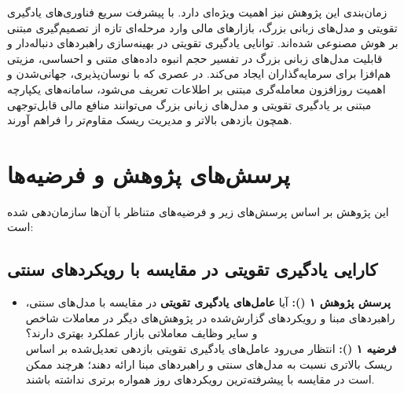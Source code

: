 \documentclass[12pt, a4paper]{report}
\begin{document}
زمان‌بندی این پژوهش نیز اهمیت ویژه‌ای دارد. با پیشرفت سریع فناوری‌های یادگیری تقویتی و مدل‌های زبانی بزرگ، بازارهای مالی وارد مرحله‌ای تازه از تصمیم‌گیری مبتنی بر هوش مصنوعی شده‌اند. توانایی یادگیری تقویتی در بهینه‌سازی راهبردهای دنباله‌دار و قابلیت مدل‌های زبانی بزرگ در تفسیر حجم انبوه داده‌های متنی و احساسی، مزیتی هم‌افزا برای سرمایه‌گذاران ایجاد می‌کند. در عصری که با نوسان‌پذیری، جهانی‌شدن و اهمیت روزافزون معامله‌گری مبتنی بر اطلاعات تعریف می‌شود، سامانه‌های یکپارچه مبتنی بر یادگیری تقویتی و مدل‌های زبانی بزرگ می‌توانند منافع مالی قابل‌توجهی همچون بازدهی بالاتر و مدیریت ریسک مقاوم‌تر را فراهم آورند.

\section{پرسش‌های پژوهش و فرضیه‌ها}

این پژوهش بر اساس پرسش‌های زیر و فرضیه‌های متناظر با آن‌ها سازمان‌دهی شده است:

\subsection*{کارایی یادگیری تقویتی در مقایسه با رویکردهای سنتی }
\begin{itemize}
    \item \textbf{پرسش پژوهش ۱ ():} آیا \textbf{عامل‌های یادگیری تقویتی} در مقایسه با مدل‌های سنتی، راهبردهای مبنا و رویکردهای گزارش‌شده در پژوهش‌های دیگر در معاملات شاخص  و سایر وظایف معاملاتی بازار عملکرد بهتری دارند؟ \\
    \textbf{فرضیه ۱ ():} انتظار می‌رود عامل‌های یادگیری تقویتی بازدهی تعدیل‌شده بر اساس ریسک بالاتری نسبت به مدل‌های سنتی و راهبردهای مبنا ارائه دهند؛ هرچند ممکن است در مقایسه با پیشرفته‌ترین رویکردهای روز همواره برتری نداشته باشند.
\end{itemize}
\end{document}
